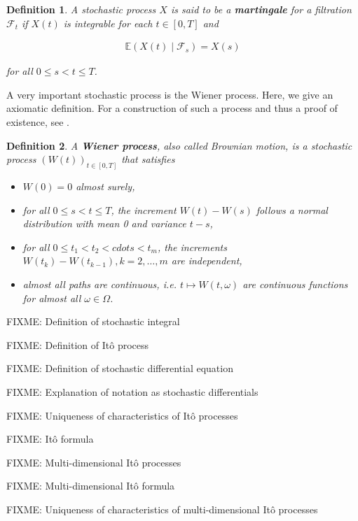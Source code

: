 \documentclass[a4paper]{article}
\newtheorem{definition}{Definition}
\begin{document}
\begin{definition}
  A stochastic process $X$ is said to be a \textbf{martingale} for a filtration $\mathcal{F}_t$ if $X(t)$ is integrable for each $t \in [0,T]$ and

  \begin{align*}
    \mathbb{E}(X(t) \mid \mathcal{F}_s) = X(s)
  \end{align*}

  for all $0 \le s < t \le T$.
\end{definition}

A very important stochastic process is the Wiener process. Here, we give an axiomatic definition. For a construction of such a process and thus a proof of existence, see \textcite{capinski_stochastic_2012}.

\begin{definition}
  A \textbf{Wiener process}, also called Brownian motion, is a stochastic process $(W(t))_{t \in [0,T]}$ that satisfies

  \begin{itemize}
    \item $W(0) = 0$ almost surely,
    \item for all $0 \le s < t \le T$, the increment $W(t) - W(s)$ follows a normal distribution with mean 0 and variance $t - s$,
    \item for all $0 \le t_1 < t_2 < cdots < t_m$, the increments $W(t_k) - W(t_{k-1}), k=2,\ldots,m$ are independent,
    \item almost all paths are continuous, i.e. $t \mapsto W(t,\omega)$ are continuous functions for almost all $\omega \in \Omega$.
  \end{itemize}
\end{definition}


FIXME: Definition of stochastic integral

FIXME: Definition of It\^o process

FIXME: Definition of stochastic differential equation

FIXME: Explanation of notation as stochastic differentials

FIXME: Uniqueness of characteristics of It\^o processes

FIXME: It\^o formula


FIXME: Multi-dimensional It\^o processes

FIXME: Multi-dimensional It\^o formula

FIXME: Uniqueness of characteristics of multi-dimensional It\^o processes
\end{document}
